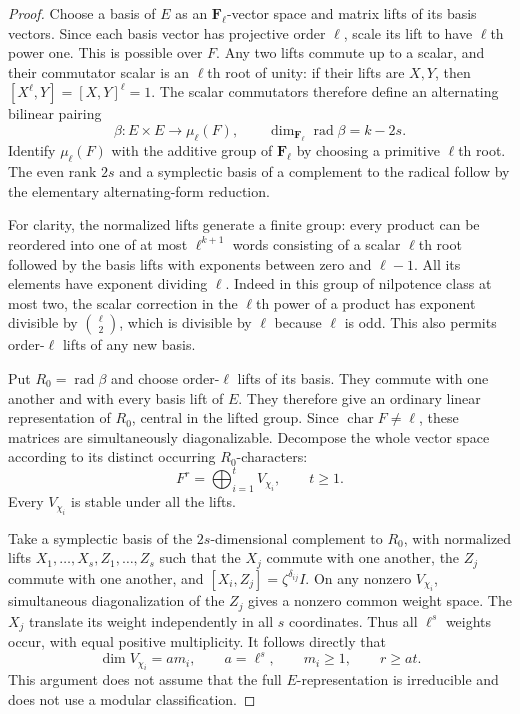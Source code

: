 \begin{proof}
Choose a basis of $E$ as an $\mathbf F_\ell$-vector space and
matrix lifts of its basis vectors. Since each basis vector has
projective order $\ell$, scale its lift to have $\ell$th power
one. This is possible over $F$. Any two lifts commute up to a
scalar, and their commutator scalar is an $\ell$th root of unity:
if their lifts are $X,Y$, then
$[X^\ell,Y]=[X,Y]^\ell=1$. The scalar commutators therefore define
an alternating bilinear pairing
\[
 \beta:E\times E\longrightarrow\mu_\ell(F),\qquad
 \dim_{\mathbf F_\ell}\operatorname{rad}\beta=k-2s.
 \tag{TDA.4}
\]
Identify $\mu_\ell(F)$ with the additive group of $\mathbf F_\ell$
by choosing a primitive $\ell$th root. The even rank $2s$ and a
symplectic basis of a complement to the radical follow by the
elementary alternating-form reduction.

For clarity, the normalized lifts generate a finite group:
every product can be reordered into one of at most
$\ell^{k+1}$ words consisting of a scalar $\ell$th root followed
by the basis lifts with exponents between zero and $\ell-1$.
All its elements have exponent dividing $\ell$. Indeed in this
group of nilpotence class at most two, the scalar correction in
the $\ell$th power of a product has exponent divisible by
$\binom{\ell}{2}$, which is divisible by $\ell$ because $\ell$
is odd. This also permits order-$\ell$ lifts of any new basis.

Put $R_0=\operatorname{rad}\beta$ and choose order-$\ell$ lifts
of its basis. They commute with one another and with every
basis lift of $E$. They therefore give an ordinary linear
representation of $R_0$, central in the lifted group. Since
$\operatorname{char}F\ne\ell$, these matrices are simultaneously
diagonalizable. Decompose the whole vector space according to
its distinct occurring $R_0$-characters:
\[
                 F^r=\bigoplus_{i=1}^t V_{\chi_i},
                       \qquad t\ge1.
 \tag{TDA.5}
\]
Every $V_{\chi_i}$ is stable under all the lifts.

Take a symplectic basis of the $2s$-dimensional complement
to $R_0$, with normalized lifts
$X_1,\ldots,X_s,Z_1,\ldots,Z_s$ such that the $X_j$ commute
with one another, the $Z_j$ commute with one another, and
$[X_i,Z_j]=\zeta^{\delta_{ij}}I$.
On any nonzero $V_{\chi_i}$, simultaneous diagonalization of
the $Z_j$ gives a nonzero common weight space. The $X_j$ translate
its weight independently in all $s$ coordinates. Thus all
$\ell^s$ weights occur, with equal positive multiplicity.
It follows directly that
\[
                \dim V_{\chi_i}=a m_i,\qquad
                a=\ell^s,\qquad m_i\ge1,\qquad r\ge at.
 \tag{TDA.6}
\]
This argument does not assume that the full $E$-representation
is irreducible and does not use a modular classification.


\end{proof}
